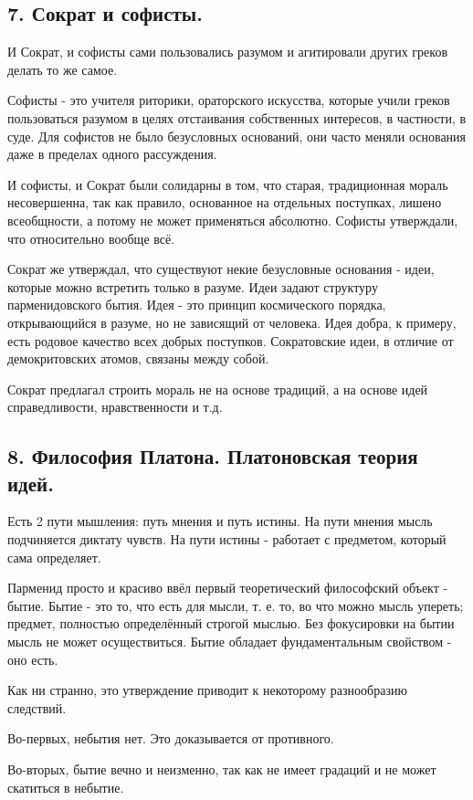 \documentclass[a4paper, 12pt]{article}
\begin{document}
\subsection*{\textbf{7. Сократ и софисты.}}

И Сократ, и софисты сами пользовались разумом и агитировали других греков делать то же самое.

Софисты - это учителя риторики, ораторского искусства, которые учили греков пользоваться разумом в целях отстаивания собственных интересов, в частности, в суде.
Для софистов не было безусловных оснований, они часто меняли основания даже в пределах одного рассуждения.

И софисты, и Сократ были солидарны в том, что старая, традиционная мораль несовершенна, так как правило, основанное на отдельных поступках, лишено всеобщности, а потому не может применяться абсолютно.
Софисты утверждали, что относительно вообще всё.

Сократ же утверждал, что существуют некие безусловные основания - идеи, которые можно встретить только в разуме.
Идеи задают структуру парменидовского бытия.
Идея - это принцип космического порядка, открывающийся в разуме, но не зависящий от человека.
Идея добра, к примеру, есть родовое качество всех добрых поступков.
Сократовские идеи, в отличие от демокритовских атомов, связаны между собой.

Сократ предлагал строить мораль не на основе традиций, а на основе идей справедливости, нравственности и т.д.


\subsection*{\textbf{8. Философия Платона. Платоновская теория идей.}}
Есть 2 пути мышления: путь мнения и путь истины.
На пути мнения мысль подчиняется диктату чувств.
На пути истины - работает с предметом, который сама определяет.

Парменид просто и красиво ввёл первый теоретический философский объект - бытие.
Бытие - это то, что есть для мысли, т. е. то, во что можно мысль упереть; предмет, полностью определённый строгой мыслью.
Без фокусировки на бытии мысль не может осуществиться.
Бытие обладает фундаментальным свойством - оно есть.

Как ни странно, это утверждение приводит к некоторому разнообразию следствий.

Во-первых, небытия нет. Это доказывается от противного.

Во-вторых, бытие вечно и неизменно, так как не имеет градаций и не может скатиться в небытие.
\end{document}
